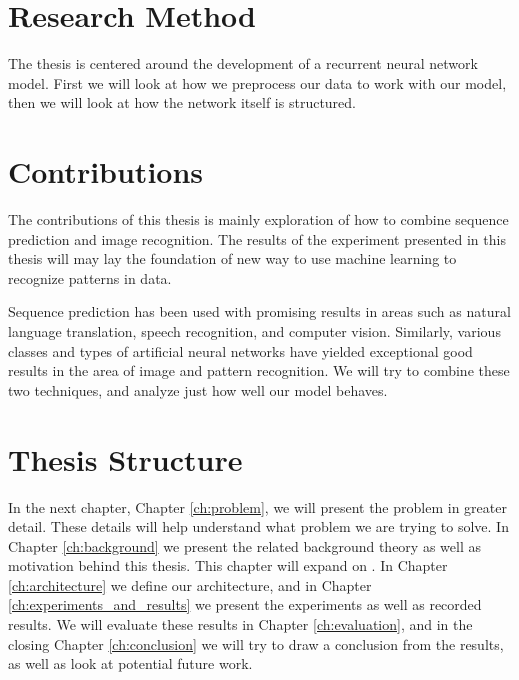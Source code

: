 
\section{Research Method}
The thesis is centered around the development of a recurrent neural network model. First we will look at how we preprocess our data to work with our model, then we will look at how the network itself is structured.


\section{Contributions}
The contributions of this thesis is mainly exploration of how to combine sequence prediction and image recognition. The results of the experiment presented in this thesis will may lay the foundation of new way to use machine learning to recognize patterns in data.

Sequence prediction has been used with promising results in areas such as natural language translation, speech recognition, and computer vision. Similarly, various classes and types of artificial neural networks have yielded exceptional good results in the area of image and pattern recognition. We will try to combine these two techniques, and analyze just how well our model behaves.



\section{Thesis Structure}
In the next chapter, Chapter \ref{ch:problem}, we will present the problem in greater detail. These details will help understand what problem we are trying to solve. In Chapter \ref{ch:background} we present the related background theory as well as motivation behind this thesis. This chapter will expand on . In Chapter \ref{ch:architecture} we define our architecture, and in Chapter \ref{ch:experiments_and_results} we present the experiments as well as recorded results. We will evaluate these results in Chapter \ref{ch:evaluation}, and in the closing Chapter \ref{ch:conclusion} we will try to draw a conclusion from the results, as well as look at potential future work.
